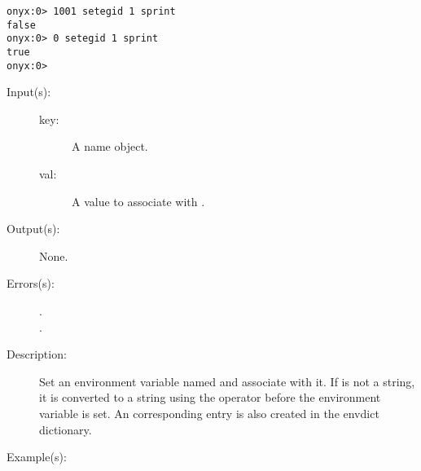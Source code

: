 \begin{description}
\begin{description}
\begin{verbatim}
onyx:0> 1001 setegid 1 sprint
false
onyx:0> 0 setegid 1 sprint
true
onyx:0>
		\end{verbatim}
	\end{description}
\label{systemdict:setenv}
\item[{\onyxop{key val}{setenv}{--}}: ]
	\begin{description}\item[]
	\item[Input(s): ]
		\begin{description}\item[]
		\item[key: ]
			A name object.
		\item[val: ]
			A value to associate with .
		\end{description}
	\item[Output(s): ] None.
	\item[Errors(s): ]
		\begin{description}\item[]
		\item[.]
		\item[.]
		\end{description}
	\item[Description: ]
		Set an environment variable named  and associate
		 with it.  If  is not a string, it is
		converted to a string using the
		 operator before the
		environment variable is set.  An corresponding entry is also
		created in the envdict dictionary.
	\item[Example(s): ]\begin{verbatim}


\end{verbatim}
\end{description}
\end{description}
